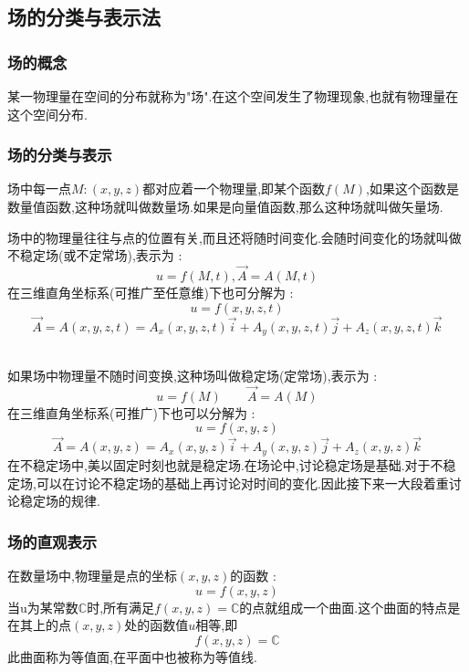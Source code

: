 \documentclass[UTF8,12pt]{ctexbook}
\newcommand{\defFunction}[1]{f(#1)}
\newcommand{\mathConstant}{\mathbb{C}}
\newcommand{\spaceline}{\\\indent}
\begin{document}
{{{{  }%

  \subsection{场的分类与表示法}{

    \subsubsection{场的概念}{
      某一物理量在空间的分布就称为"场".在这个空间发生了物理现象,也就有物理量在这个空间分布.
    }%

    \subsubsection{场的分类与表示}{
      场中每一点$M:(x,y,z)$都对应着一个物理量,即某个函数$\defFunction{M}$,如果这个函数是数量值函数,这种场就叫做数量场.如果是向量值函数,那么这种场就叫做矢量场.

      场中的物理量往往与点的位置有关,而且还将随时间变化.会随时间变化的场就叫做不稳定场(或不定常场),表示为 :
      $$
        u= \defFunction{M,t},\vec{A} = A(M,t)
      $$
      在三维直角坐标系(可推广至任意维)下也可分解为 :
      $$
        u = \defFunction{x,y,z,t}
      $$
      $$
        \vec{A} = A(x,y,z,t) = A_x(x,y,z,t)\vec{i} + A_y(x,y,z,t)\vec{j} + A_z(x,y,z,t)\vec{k}
      $$\spaceline

      如果场中物理量不随时间变换,这种场叫做稳定场(定常场),表示为 :
      $$
        u= \defFunction{M}\qquad \vec{A} = A(M)
      $$
      在三维直角坐标系(可推广)下也可以分解为 :
      $$
        u= \defFunction{x,y,z}
      $$
      $$
        \vec{A} = A(x,y,z) = A_x(x,y,z)\vec{i} + A_y(x,y,z)\vec{j} + A_z(x,y,z)\vec{k}
      $$
      在不稳定场中,美以固定时刻也就是稳定场.在场论中,讨论稳定场是基础.对于不稳定场,可以在讨论不稳定场的基础上再讨论对时间的变化.因此接下来一大段着重讨论稳定场的规律.
    }%

    \subsubsection{场的直观表示}{
      在数量场中,物理量是点的坐标$(x,y,z)$的函数 :
      $$
        u = \defFunction{x,y,z}
      $$
      当u为某常数$\mathConstant$时,所有满足$\defFunction{x,y,z} = \mathConstant$的点就组成一个曲面.这个曲面的特点是在其上的点$(x,y,z)$处的函数值$u$相等,即
      $$
        \defFunction{x,y,z} = \mathConstant
      $$
      此曲面称为等值面,在平面中也被称为等值线.

}}}}}
\end{document}
